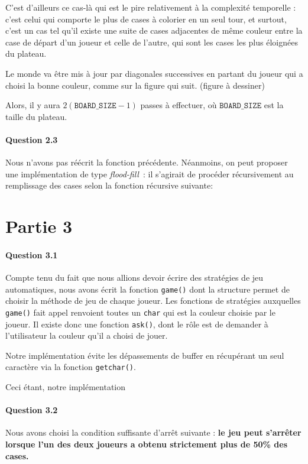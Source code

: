 \documentclass[a4paper]{article}
\newcommand{\boardsize}{\ensuremath{\mathtt{BOARD\_SIZE}}}
\begin{document}
C'est d'ailleurs ce cas-là qui est le pire relativement à la complexité 
temporelle : c'est celui qui comporte le plus de cases à colorier en un seul 
tour, et surtout, c'est un cas tel qu'il existe une suite de cases adjacentes 
de même couleur entre la case de départ d'un joueur et celle de l'autre, qui 
sont les cases les plus éloignées du plateau.

Le monde va être mis à jour par diagonales successives en partant du joueur qui 
a choisi la bonne couleur, comme sur la figure qui suit. (figure à dessiner)

Alors, il y aura $2(\boardsize-1)$ passes à effectuer, où \boardsize{} est la 
taille du plateau. 

    \paragraph{Question 2.3}
    Nous n'avons pas réécrit la fonction précédente. Néanmoins, on peut 
proposer une implémentation de type \emph{flood-fill}~: il s'agirait de 
procéder récursivement au remplissage des cases selon la fonction récursive 
suivante:
    \section{Partie 3}
    \paragraph{Question 3.1} Compte tenu du fait que nous allions devoir 
écrire des stratégies de jeu automatiques, nous avons écrit la fonction 
\texttt{game()} dont la structure permet de choisir la méthode de jeu de chaque 
joueur. Les fonctions de stratégies auxquelles \texttt{game()} fait appel 
renvoient toutes un \texttt{char} qui est la couleur choisie par le joueur.
Il existe donc une fonction \texttt{ask()}, dont le rôle est de demander à 
l'utilisateur la couleur qu'il a choisi de jouer. 

Notre implémentation évite les dépassements de buffer en récupérant un seul 
caractère via la fonction \texttt{getchar()}. 

Ceci étant, notre implémentation 
    \paragraph{Question 3.2}
    Nous avons choisi la condition suffisante d'arrêt suivante : \textbf{le jeu 
peut s'arrêter lorsque l'un des deux joueurs a obtenu strictement plus de 50\% 
des cases.}
\end{document}

